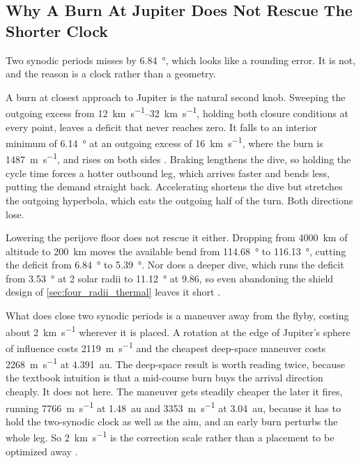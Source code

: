 \documentclass{article}
\begin{document}
\subsection*{Why A Burn At Jupiter Does Not Rescue The Shorter Clock}
Two synodic periods misses by \SI{6.84}{\degree}, which looks like a rounding error. It is not, and the reason is a clock rather than a geometry.

A burn at closest approach to Jupiter is the natural second knob. Sweeping the outgoing excess from \SIrange{12}{32}{\kilo\meter\per\second}, holding both closure conditions at every point, leaves a deficit that never reaches zero. It falls to an interior minimum of \SI{6.14}{\degree} at an outgoing excess of \SI{16}{\kilo\meter\per\second}, where the burn is \SI{1487}{\meter\per\second}, and rises on both sides \cite{Katz_aim_is_all_you_need_2025}. Braking lengthens the dive, so holding the cycle time forces a hotter outbound leg, which arrives faster and bends less, putting the demand straight back. Accelerating shortens the dive but stretches the outgoing hyperbola, which eats the outgoing half of the turn. Both directions lose.

Lowering the perijove floor does not rescue it either. Dropping from \SI{4000}{\kilo\meter} of altitude to \SI{200}{\kilo\meter} moves the available bend from \SI{114.68}{\degree} to \SI{116.13}{\degree}, cutting the deficit from \SI{6.84}{\degree} to \SI{5.39}{\degree}. Nor does a deeper dive, which runs the deficit from \SI{3.53}{\degree} at 2 solar radii to \SI{11.12}{\degree} at 9.86, so even abandoning the shield design of \autoref{sec:four_radii_thermal} leaves it short \cite{Katz_aim_is_all_you_need_2025}.

What does close two synodic periods is a maneuver away from the flyby, costing about \SI{2}{\kilo\meter\per\second} wherever it is placed. A rotation at the edge of Jupiter's sphere of influence costs \SI{2119}{\meter\per\second} and the cheapest deep-space maneuver costs \SI{2268}{\meter\per\second} at \SI{4.391}{\astronomicalunit}. The deep-space result is worth reading twice, because the textbook intuition is that a mid-course burn buys the arrival direction cheaply. It does not here. The maneuver gets steadily cheaper the later it fires, running \SI{7766}{\meter\per\second} at \SI{1.48}{\astronomicalunit} and \SI{3353}{\meter\per\second} at \SI{3.04}{\astronomicalunit}, because it has to hold the two-synodic clock as well as the aim, and an early burn perturbs the whole leg. So \SI{2}{\kilo\meter\per\second} is the correction scale rather than a placement to be optimized away \cite{Katz_aim_is_all_you_need_2025}.
\end{document}
